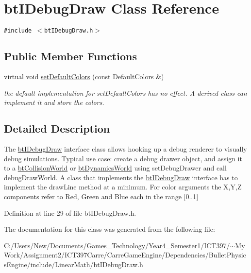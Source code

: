\hypertarget{classbt_i_debug_draw}{
\section{btIDebugDraw Class Reference}
\label{classbt_i_debug_draw}
}
{\tt \#include $<$btIDebugDraw.h$>$}

\subsection*{Public Member Functions}
\begin{CompactItemize}
\item 
\hypertarget{classbt_i_debug_draw_ec5aa09aa69cc324c98788a979b094ce}{
virtual void \hyperlink{classbt_i_debug_draw_ec5aa09aa69cc324c98788a979b094ce}{setDefaultColors} (const DefaultColors \&)}
\label{classbt_i_debug_draw_ec5aa09aa69cc324c98788a979b094ce}

\begin{CompactList}\small\item\em the default implementation for setDefaultColors has no effect. A derived class can implement it and store the colors. \item\end{CompactList}\end{CompactItemize}


\subsection{Detailed Description}
The \hyperlink{classbt_i_debug_draw}{btIDebugDraw} interface class allows hooking up a debug renderer to visually debug simulations. Typical use case: create a debug drawer object, and assign it to a \hyperlink{classbt_collision_world}{btCollisionWorld} or \hyperlink{classbt_dynamics_world}{btDynamicsWorld} using setDebugDrawer and call debugDrawWorld. A class that implements the \hyperlink{classbt_i_debug_draw}{btIDebugDraw} interface has to implement the drawLine method at a minimum. For color arguments the X,Y,Z components refer to Red, Green and Blue each in the range \mbox{[}0..1\mbox{]} 

Definition at line 29 of file btIDebugDraw.h.

The documentation for this class was generated from the following file:\begin{CompactItemize}
\item 
C:/Users/New/Documents/Games\_\-Technology/Year4\_\-Semester1/ICT397/$\sim$My Work/Assignment2/ICT397Carre/CarreGameEngine/Dependencies/BulletPhysicsEngine/include/LinearMath/btIDebugDraw.h\end{CompactItemize}

